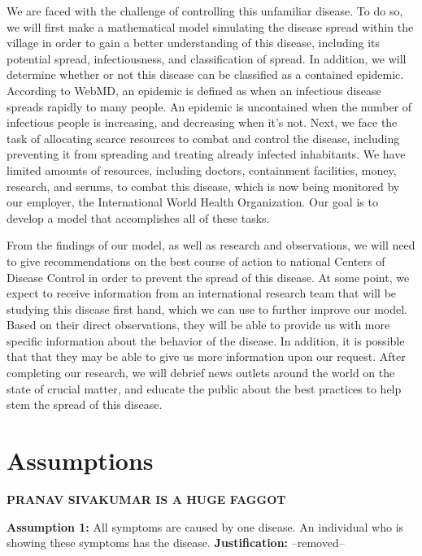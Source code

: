 \documentclass[12pt]{article}
\begin{document}
We are faced with the challenge of controlling this unfamiliar disease. To do so, we will first make a mathematical model simulating the disease spread within the village in order to gain a better understanding of this disease, including its potential spread, infectiousness, and classification of spread. In addition, we will determine whether or not this disease can be classified as a contained epidemic. According to WebMD, an epidemic is defined as when an infectious disease spreads rapidly to many people. An epidemic is uncontained when the number of infectious people is increasing, and decreasing when it’s not. Next, we face the task of allocating scarce resources to combat and control the disease, including preventing it from spreading and treating already infected inhabitants. We have limited amounts of resources, including doctors, containment facilities, money, research, and serums, to combat this disease, which is now being monitored by our employer, the International World Health Organization. Our goal is to develop a model that accomplishes all of these tasks.

From the findings of our model, as well as research and observations, we will need to give recommendations on the best course of action to national Centers of Disease Control in order to prevent the spread of this disease. At some point, we expect to receive information from an international research team that will be studying this disease first hand, which we can use to further improve our model. Based on their direct observations, they will be able to provide us with more specific information about the behavior of the disease. In addition, it is possible that that they may be able to give us more information upon our request. After completing our research, we will debrief news outlets around the world on the state of crucial matter, and educate the public about the best practices to help stem the spread of this disease.

\newpage
\section{Assumptions}

\textbf{PRANAV SIVAKUMAR IS A HUGE FAGGOT}

\textbf{Assumption 1:} All symptoms are caused by one disease. An individual who is showing these symptoms has the disease.
\newline
\textbf{Justification:} --removed--
\end{document}
